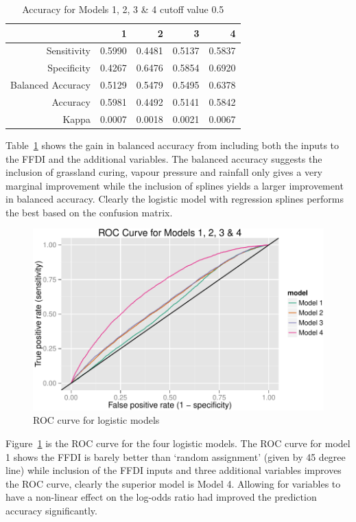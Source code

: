 \documentclass[11pt,a4paper]{article}
\begin{document}
\begin{table}
  \centering
  \begin{tabular}{rrrrr}
    \toprule
                      & 1      & 2      & 3      & 4 \\
    \midrule
    Sensitivity       & 0.5990 & 0.4481 & 0.5137 & 0.5837 \\
    Specificity       & 0.4267 & 0.6476 & 0.5854 & 0.6920 \\
    Balanced Accuracy & 0.5129 & 0.5479 & 0.5495 & 0.6378 \\
    Accuracy          & 0.5981 & 0.4492 & 0.5141 & 0.5842 \\
    Kappa             & 0.0007 & 0.0018 & 0.0021 & 0.0067 \\
    \bottomrule
  \end{tabular}
  \caption{Accuracy for Models 1, 2, 3 \& 4 cutoff value 0.5}
  \label{table:acc2}
\end{table}

Table~\ref{table:acc2} shows the gain in balanced accuracy from including both the inputs to the FFDI and the additional variables. The balanced accuracy suggests the inclusion of grassland curing, vapour pressure and rainfall only gives a very marginal improvement while the inclusion of splines yields a larger improvement in balanced accuracy. Clearly the logistic model with regression splines performs the best based on the confusion matrix.

\begin{figure}
  \centering
	\includegraphics[width=.8\textwidth]{figures/all_roc.pdf}
  \caption{ROC curve for logistic models}
  \label{fig:ffdi}
\end{figure}


Figure~\ref{fig:ffdi} is the ROC curve for the four logistic models. The ROC curve for model 1 shows the FFDI is barely better than `random assignment' (given by 45 degree line) while inclusion of the FFDI inputs and three additional variables improves the ROC curve, clearly the superior model is Model 4. Allowing for variables to have a non-linear effect on the log-odds ratio had improved the prediction accuracy significantly.
\end{document}
